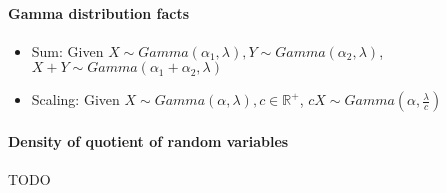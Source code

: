 \documentclass[a4paper]{article}
\begin{document}
\paragraph{Gamma distribution facts}
\begin{itemize}
	\item Sum: Given $X\sim Gamma(\alpha_1, \lambda), Y\sim Gamma(\alpha_2, \lambda)$, $X+Y\sim Gamma(\alpha_1 + \alpha_2, \lambda)$
	\item Scaling: Given $X\sim Gamma(\alpha, \lambda), c\in \mathbb{R}^+$, $cX\sim Gamma(\alpha, \frac{\lambda}{c})$
\end{itemize}

\paragraph{Density of quotient of random variables}
TODO
\end{document}
